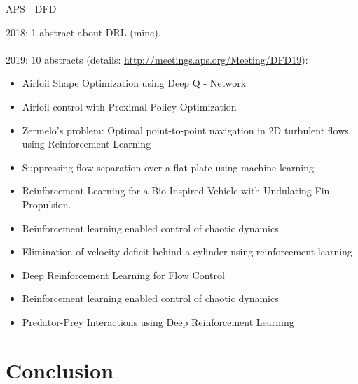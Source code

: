 \documentclass{beamer}
\begin{document}
\begin{frame}{APS - DFD}

{\small
2018: 1 abstract about DRL (mine). \\~\\

2019: 10 abstracts (details: \url{http://meetings.aps.org/Meeting/DFD19}):

\begin{itemize}
\item Airfoil Shape Optimization using Deep Q - Network

\item Airfoil control with Proximal Policy Optimization

\item Zermelo's problem: Optimal point-to-point navigation in 2D turbulent flows using Reinforcement Learning

\item Suppressing flow separation over a flat plate using machine learning

\item Reinforcement Learning for a Bio-Inspired Vehicle with Undulating Fin Propulsion.

\item Reinforcement learning enabled control of chaotic dynamics

\item Elimination of velocity deficit behind a cylinder using reinforcement learning

\item Deep Reinforcement Learning for Flow Control

\item Reinforcement learning enabled control of chaotic dynamics

\item Predator-Prey Interactions using Deep Reinforcement Learning
\end{itemize}
}
\end{frame}

\section{Conclusion}
\end{document}
